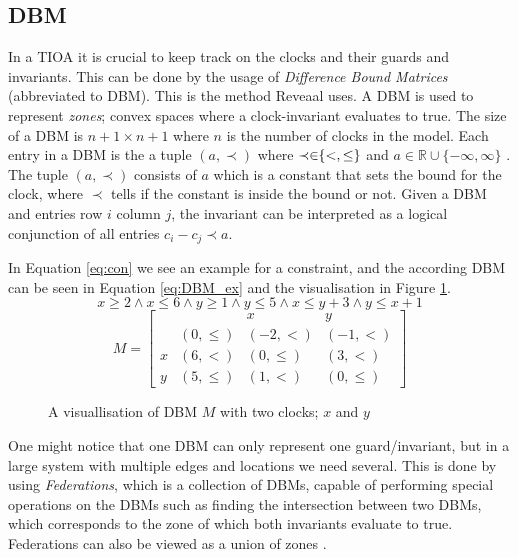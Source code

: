 \subsection{DBM}\label{sec:DBM}
In a TIOA it is crucial to keep track on the clocks and their guards and invariants. This can be done by the usage of \emph{Difference Bound Matrices} (abbreviated to DBM). This is the method Reveaal uses.
A DBM is used to represent \emph{zones};  convex spaces where a clock-invariant evaluates to true. The size of a DBM is $n+1 \times n+1$ where $n$ is the number of clocks in the model.
Each entry in a DBM is the a tuple $(a, \prec)$ where $\prec \in \hspace{-3pt} \{<, \leq\}$ and $a \in \mathbb{R} \cup \{ -\infty, \infty \}$ \cite{peron:hal-00189821, Joost:DBM19}. The tuple $(a, \prec)$ consists of $a$ which is a constant that sets the bound for the clock, where $\prec$ tells if the constant is inside the bound or not.
Given a DBM and entries row $i$ column $j$, the invariant can be interpreted as a logical conjunction of all entries $c_i - c_j \prec a$. 

In Equation \ref{eq:con} we see an example for a constraint, and the according DBM can be seen in Equation \ref{eq:DBM_ex} and the visualisation in Figure \ref{fig:DBM_ex}.
\begin{equation}\label{eq:con}
    x \geq 2 \wedge x \leq 6 \wedge y \geq 1 \wedge y \leq 5 \wedge x \leq y + 3 \wedge y \leq x + 1
\end{equation}
\begin{equation}\label{eq:DBM_ex}
    M = 
    \begin{bmatrix}
                 &&    x    &    y\\
          & (0, \leq) & (-2, <) & (-1, <)\\
        x & (6, <) & (0, \leq) & (3, <)\\
        y & (5, \leq) & (1, <) & (0, \leq) 
    \end{bmatrix}
\end{equation}

\begin{figure}[H]
    \centering
    \caption{A visuallisation of DBM $M$ with two clocks; $x$ and $y$}
    \label{fig:DBM_ex}
\end{figure}

One might notice that one DBM can only represent one guard/invariant, but in a large system with multiple edges and locations we need several. This is done by using \emph{Federations}, which is a collection of DBMs, capable of performing special operations on the DBMs such as finding the intersection between two DBMs, which corresponds to the zone of which both invariants evaluate to true. Federations can also be viewed as a union of zones \cite{ecdartheory, Rokicki_DBM}.